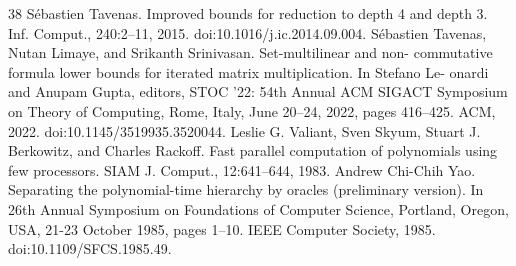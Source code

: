 \documentclass[10pt,a4paper]{article}
\begin{document}
\begin{thebibliography}{38}
 Sébastien Tavenas. Improved bounds for reduction to depth 4 and depth 3. Inf. Comput., 240:2–11, 2015. doi:10.1016/j.ic.2014.09.004.
 Sébastien Tavenas, Nutan Limaye, and Srikanth Srinivasan. Set-multilinear and non- commutative formula lower bounds for iterated matrix multiplication. In Stefano Le- onardi and Anupam Gupta, editors, STOC ’22: 54th Annual ACM SIGACT Symposium on Theory of Computing, Rome, Italy, June 20–24, 2022, pages 416–425. ACM, 2022. doi:10.1145/3519935.3520044.
 Leslie G. Valiant, Sven Skyum, Stuart J. Berkowitz, and Charles Rackoff. Fast parallel computation of polynomials using few processors. SIAM J. Comput., 12:641–644, 1983.
 Andrew Chi-Chih Yao. Separating the polynomial-time hierarchy by oracles (preliminary version). In 26th Annual Symposium on Foundations of Computer Science, Portland, Oregon, USA, 21-23 October 1985, pages 1–10. IEEE Computer Society, 1985. doi:10.1109/SFCS.1985.49.
\end{thebibliography}
\end{document}
